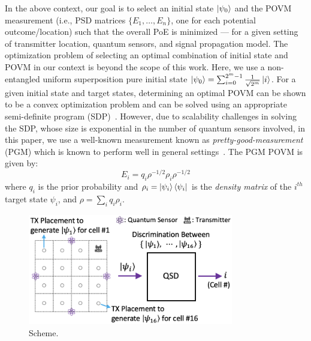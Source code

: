 In the above context, our goal is to select an initial state $\ket{\psi_0}$ and the 
POVM measurement (i.e., PSD matrices $\{E_1, \ldots, E_n\}$, one for each potential outcome/location) such that the overall  PoE is minimized --- for a given setting of transmitter location, quantum sensors, and signal propagation model.
The optimization problem of selecting an optimal combination of initial state and POVM
in our context is beyond the scope of this work. Here, we use a non-entangled uniform superposition
pure initial state $\ket{\psi_0} = \sum_{i=0}^{2^m-1} \frac{1}{\sqrt{2^m}} \ket{i} $. 
For a given initial state and target states, determining an optimal POVM can be shown to
be a convex optimization problem and can be solved using an appropriate semi-definite program (SDP)~\cite{semidefinite}. However, due to scalability challenges in solving the
SDP, whose size is exponential in the number of quantum sensors involved, 
in this paper, we use
a well-known measurement known as {\em pretty-good-measurement} (PGM) which is known to
perform well in general settings~\cite{prettygood}. The PGM POVM is given by: 
\begin{equation}
    E_i = q_i {\rho}^{-1/2} \rho_i {\rho}^{-1/2}
    \label{eqn:pgm}
\end{equation}
where $q_i$ is the prior probability and $\rho_i = \ket{\psi_i}\bra{\psi_i}$ is the {\em density matrix} of the $i^{th}$ target state $\psi_i$, and  $\rho = \sum_{i} q_i \rho_i$. 

\begin{figure}
    \centering
    \includegraphics[width=0.8\textwidth]{chapters/qce/figures/onelevel.png}
    \caption{\povmone Scheme.}
    \label{fig:onelevel}
\end{figure}



